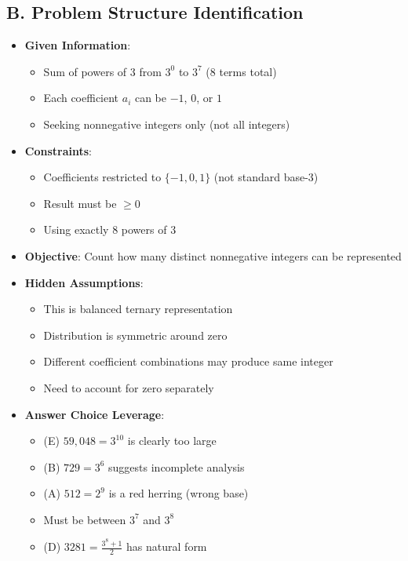 \documentclass[12pt]{article}
\begin{document}
\begin{problemconfigbox}
\subsection*{B. Problem Structure Identification}
\begin{itemize}[leftmargin=*]
    \item \textbf{Given Information}: 
    \begin{itemize}
        \item Sum of powers of 3 from $3^0$ to $3^7$ (8 terms total)
        \item Each coefficient $a_i$ can be $-1$, $0$, or $1$
        \item Seeking nonnegative integers only (not all integers)
    \end{itemize}
    \item \textbf{Constraints}: 
    \begin{itemize}
        \item Coefficients restricted to $\{-1,0,1\}$ (not standard base-3)
        \item Result must be $\geq 0$
        \item Using exactly 8 powers of 3
    \end{itemize}
    \item \textbf{Objective}: Count how many distinct nonnegative integers can be represented
    \item \textbf{Hidden Assumptions}: 
    \begin{itemize}
        \item This is balanced ternary representation
        \item Distribution is symmetric around zero
        \item Different coefficient combinations may produce same integer
        \item Need to account for zero separately
    \end{itemize}
    \item \textbf{Answer Choice Leverage}: 
    \begin{itemize}
        \item (E) $59,048 = 3^{10}$ is clearly too large
        \item (B) $729 = 3^6$ suggests incomplete analysis
        \item (A) $512 = 2^9$ is a red herring (wrong base)
        \item Must be between $3^7$ and $3^8$
        \item (D) $3281 = \frac{3^8+1}{2}$ has natural form
    \end{itemize}
\end{itemize}


\end{problemconfigbox}
\end{document}
